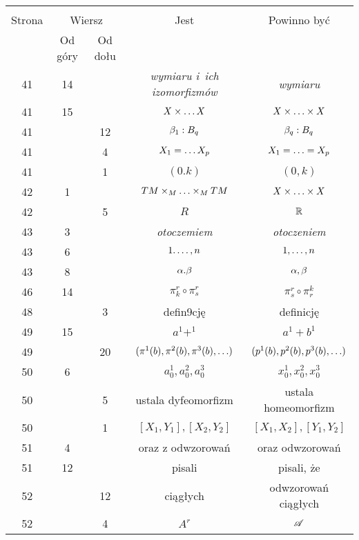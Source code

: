 \documentclass[a4paper,11pt]{article}
\begin{document}
\begin{center}
  \begin{tabular}{|c|c|c|c|c|}
    \hline
    & \multicolumn{2}{c|}{} & & \\
    Strona & \multicolumn{2}{c|}{Wiersz} & Jest
                              & Powinno być \\ \cline{2-3}
    & Od góry & Od dołu & & \\
    \hline
    41  & 14 & & \emph{wymiaru i~ich izomorfizmów} & \emph{wymiaru} \\
    41  & 15 & & $X \times \ldots X$ & $X \times \ldots \times X$ \\
    41  & & 12 & $\beta_{ 1 } : B_{ q }$ & $\beta_{ q } : B_{ q }$ \\
    41  & &  4 & $X_{ 1 } = \ldots X_{ p }$ & $X_{ 1 } = \ldots = X_{ p }$ \\
    41  & &  1 & $( 0. k )$ & $( 0, k )$ \\
    42  & 1 & & $TM \times_{ M } \ldots \times_{ M } TM$ & $X \times \ldots \times X$ \\
    42  & & 5 & $R$ & $\mathbb{R}$ \\
    43  &  3 & & \emph{otoczemiem} & \emph{otoczeniem} \\
    43  &  6 & & $1 . \ldots, n$ & $1, \ldots, n$ \\
    43  &  8 & & $\alpha. \beta$ & $\alpha, \beta$ \\
    46  & 14 & & $\pi_{ k }^{ r } \circ \pi^{ r }_{ s }$
           & $\pi_{ s }^{ r } \circ \pi^{ k }_{ r }$ \\
    48  & & 3 & defin9cję & definicję \\
    49  & 15 & & $a^{ 1 } + ^{ 1 }$ & $a^{ 1 } + b^{ 1 }$ \\
    49  & & 20 & $( \pi^{ 1 } ( b ), \pi^{ 2 } ( b ), \pi^{ 3 } ( b ),
                 \ldots )$ & $( p^{ 1 } ( b ), p^{ 2 } ( b ),
                          p^{ 3 } ( b ), \ldots )$ \\
    50  & 6 & & $a_{ 0 }^{ 1 }, a_{ 0 }^{ 2 }, a_{ 0 }^{ 3 }$
           & $x_{ 0 }^{ 1 }, x_{ 0 }^{ 2 }, x_{ 0 }^{ 3 }$ \\
    50  & & 5 & ustala dyfeomorfizm & ustala homeomorfizm \\
    50  & & 1 & $[ X_{ 1 }, Y_{ 1 }], [ X_{ 2 }, Y_{ 2 } ]$
           & $[ X_{ 1 }, X_{ 2 }], [ Y_{ 1 }, Y_{ 2 } ]$ \\
    51  &  4 & & oraz z odwzorowań & oraz odwzorowań \\
    51  & 12 & & pisali & pisali, że \\
    52  & & 12 & ciągłych & odwzorowań ciągłych \\
    52  & &  4 & $A^{ r }$ & $\mathcal{A}$ \\

\end{tabular}
\end{center}
\end{document}
